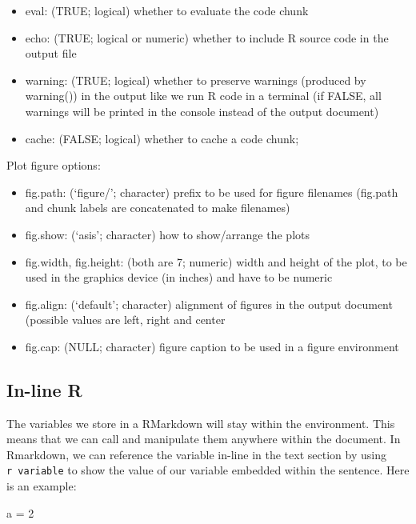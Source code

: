 \documentclass[]{book}
\newenvironment{Shaded}{\begin{snugshade}}{\end{snugshade}}
\newcommand{\DecValTok}[1]{\textcolor[rgb]{0.00,0.00,0.81}{{#1}}}
\newcommand{\StringTok}[1]{\textcolor[rgb]{0.31,0.60,0.02}{{#1}}}
\newcommand{\NormalTok}[1]{{#1}}
\providecommand{\tightlist}{%
  \setlength{\itemsep}{0pt}\setlength{\parskip}{0pt}}
\theoremstyle{definition}
\theoremstyle{definition}
\theoremstyle{remark}
\begin{document}
\begin{itemize}
\tightlist
\item
  eval: (TRUE; logical) whether to evaluate the code chunk
\item
  echo: (TRUE; logical or numeric) whether to include R source code in
  the output file
\item
  warning: (TRUE; logical) whether to preserve warnings (produced by
  warning()) in the output like we run R code in a terminal (if FALSE,
  all warnings will be printed in the console instead of the output
  document)
\item
  cache: (FALSE; logical) whether to cache a code chunk;
\end{itemize}

Plot figure options:

\begin{itemize}
\tightlist
\item
  fig.path: (`figure/'; character) prefix to be used for figure
  filenames (fig.path and chunk labels are concatenated to make
  filenames)
\item
  fig.show: (`asis'; character) how to show/arrange the plots
\item
  fig.width, fig.height: (both are 7; numeric) width and height of the
  plot, to be used in the graphics device (in inches) and have to be
  numeric
\item
  fig.align: (`default'; character) alignment of figures in the output
  document (possible values are left, right and center
\item
  fig.cap: (NULL; character) figure caption to be used in a figure
  environment
\end{itemize}

\subsection*{In-line R}\label{in-line-r}

The variables we store in a RMarkdown will stay within the environment.
This means that we can call and manipulate them anywhere within the
document. In Rmarkdown, we can reference the variable in-line in the
text section by using \texttt{r\ variable} to show the value of our
variable embedded within the sentence. Here is an example:

\begin{Shaded}
\begin{Highlighting}[]
\NormalTok{a =}\StringTok{ }\DecValTok{2}
\end{Highlighting}
\end{Shaded}
\end{document}
